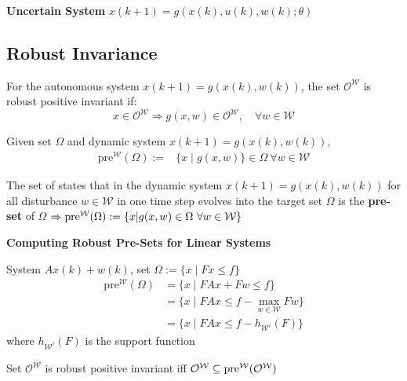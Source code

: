 
\textbf{Uncertain System}
$x(k+1) = g(x(k), u(k), w(k); \theta)$


\subsection{Robust Invariance}

\begin{definition}
	For the autonomous system
	$x(k+1)=g(x(k),w(k))$,
	the set $\mathcal{O}^\mathcal{W}$
	is robust positive invariant
	if:
	\[
		x\in\mathcal{O}^\mathcal{W}\Rightarrow
		g(x,w) \in \mathcal{O}^\mathcal{W},
		\quad \forall w \in \mathcal{W}
	\]
\end{definition}

Given set $\Omega$ and dynamic system $x(k+1) = g(x(k), w(k))$,
\begin{align*}
	\mathrm{pre}^{\mathcal{W}}(\Omega) := & \{x \mid g(x,w)\} \in \Omega \ \forall w \in \mathcal{W}
\end{align*}


\begin{definition}
	The set of states that
	in the dynamic system $x(k+1) = g(x(k),w(k))$
	for all disturbance $w\in\mathcal{W}$
	in one time step evolves into the target set $\Omega$
	is the \textbf{pre-set} of $\Omega$
	$\Rightarrow \operatorname{pre}^\mathcal{W}(\Omega) :=
		\{x|g(x,w)\in \Omega\ \forall w\in\mathcal{W}\}$
\end{definition}

\textbf{Computing Robust Pre-Sets for Linear Systems}

System $Ax(k) + w(k)$, set $\Omega:= \{x \mid Fx \leq f\}$
\begin{align*}
	\mathrm{pre}^{\mathcal{W}}(\Omega)
	 & = \{ x \mid FAx + Fw \leq f\}
	\\
	 & = \{ x \mid FAx \leq f- \max_{w\in\mathcal{W}}Fw \}
	\\
	 & = \{ x \mid FAx \leq f -  h_{\mathcal{W}^i}(F) \}
\end{align*}
%
where $h_{\mathcal{W}^i}(F)$ is the support function

\begin{theorem}
	Set $\mathcal{O}^\mathcal{W}$
	is robust positive invariant iff
	$\mathcal{O}^\mathcal{W} \subseteq
		\operatorname{pre}^\mathcal{W}(\mathcal{O}^\mathcal{W})$
\end{theorem}


